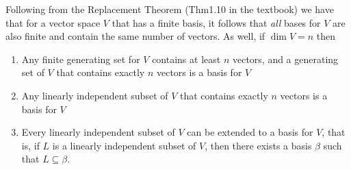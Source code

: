 \documentclass{exam}
\begin{document}
    Following from the Replacement Theorem (Thm1.10 in the textbook) we have that for a vector space $V$ that has a finite basis, it follows that \emph{all} bases for $V$ are also finite and contain the same number of vectors. As well, if $\dim V = n$ then 
    \begin{enumerate}
        \item Any finite generating set for $V$ contains at least $n$ vectors, and a generating set of $V$ that contains exactly $n$ vectors is a basis for $V$ 
        \item Any linearly independent subset of $V$ that contains exactly $n$ vectors is a basis for $V$ 
        \item Every linearly independent subset of $V$ can be extended to a basis for $V$, that is, if $L$ is a linearly independent subset of $V$, then there exists a basis $\beta$ such that $L \subseteq \beta$.
    \end{enumerate}
\end{document}

